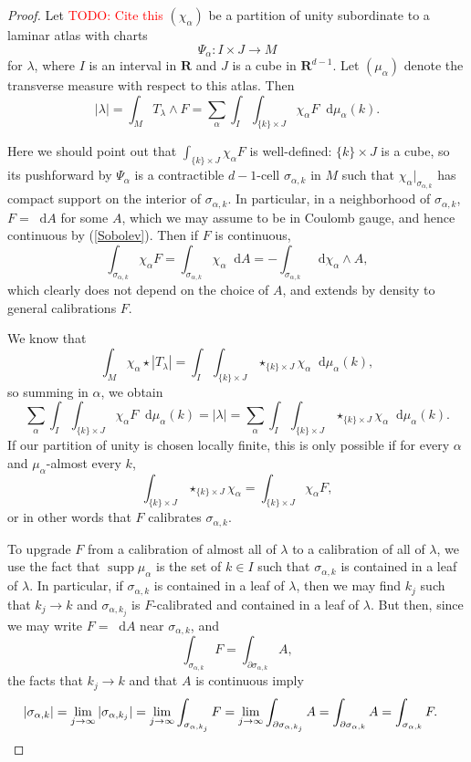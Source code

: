 \documentclass[reqno,11pt]{amsart}
\newcommand{\RR}{\mathbf{R}}
\newcommand*\dif{\mathop{}\!\mathrm{d}}
\DeclareMathOperator{\supp}{supp}
\theoremstyle{definition}
\numberwithin{equation}{section}
\newcommand\todo[1]{\textcolor{red}{TODO: #1}}
\begin{document}
\begin{proof}
Let \todo{Cite this} $(\chi_\alpha)$ be a partition of unity subordinate to a laminar atlas with charts
$$\Psi_\alpha: I \times J \to M$$
for $\lambda$, where $I$ is an interval in $\RR$ and $J$ is a cube in $\RR^{d - 1}$.
Let $(\mu_\alpha)$ denote the transverse measure with respect to this atlas.
Then 
$$|\lambda| = \int_M T_\lambda \wedge F = \sum_\alpha \int_I \int_{\{k\} \times J} \chi_\alpha F \dif \mu_\alpha(k).$$

Here we should point out that $\int_{\{k\} \times J} \chi_\alpha F$ is well-defined: $\{k\} \times J$ is a cube, so its pushforward by $\Psi_\alpha$ is a contractible $d-1$-cell $\sigma_{\alpha, k}$ in $M$ such that $\chi_\alpha|_{\sigma_{\alpha, k}}$ has compact support on the interior of $\sigma_{\alpha, k}$.
In particular, in a neighborhood of $\sigma_{\alpha, k}$, $F = \dif A$ for some $A$, which we may assume to be in Coulomb gauge, and hence continuous by (\ref{Sobolev}).
Then if $F$ is continuous,
$$\int_{\sigma_{\alpha, k}} \chi_\alpha F = \int_{\sigma_{\alpha, k}} \chi_\alpha \dif A = -\int_{\sigma_{\alpha, k}} \dif \chi_\alpha \wedge A,$$
which clearly does not depend on the choice of $A$, and extends by density to general calibrations $F$.

We know that 
$$\int_M \chi_\alpha \star |T_\lambda| = \int_I \int_{\{k\} \times J} \star_{\{k\} \times J} \chi_\alpha \dif \mu_\alpha(k),$$
so summing in $\alpha$, we obtain 
$$\sum_\alpha \int_I \int_{\{k\} \times J} \chi_\alpha F \dif \mu_\alpha(k) = |\lambda| = \sum_\alpha \int_I \int_{\{k\} \times J} \star_{\{k\} \times J} \chi_\alpha \dif \mu_\alpha(k).$$
If our partition of unity is chosen locally finite, this is only possible if for every $\alpha$ and $\mu_\alpha$-almost every $k$, 
$$\int_{\{k\} \times J} \star_{\{k\} \times J} \chi_\alpha = \int_{\{k\} \times J} \chi_\alpha F,$$
or in other words that $F$ calibrates $\sigma_{\alpha, k}$.

To upgrade $F$ from a calibration of almost all of $\lambda$ to a calibration of all of $\lambda$, we use the fact that $\supp \mu_\alpha$ is the set of $k \in I$ such that $\sigma_{\alpha, k}$ is contained in a leaf of $\lambda$.
In particular, if $\sigma_{\alpha, k}$ is contained in a leaf of $\lambda$, then we may find $k_j$ such that $k_j \to k$ and $\sigma_{\alpha, k_j}$ is $F$-calibrated and contained in a leaf of $\lambda$.
But then, since we may write $F = \dif A$ near $\sigma_{\alpha, k}$, and 
$$\int_{\sigma_{\alpha, k}} F = \int_{\partial \sigma_{\alpha, k}} A,$$
the facts that $k_j \to k$ and that $A$ is continuous imply 
\begin{align*}
|\sigma_{\alpha, k}| &= \lim_{j \to \infty} |\sigma_{\alpha, k_j}| = \lim_{j \to \infty} \int_{\sigma_{\alpha, k_j}} F = \lim_{j \to \infty} \int_{\partial \sigma_{\alpha, k_j}} A = \int_{\partial \sigma_{\alpha, k}} A = \int_{\sigma_{\alpha, k}} F. \qedhere 
\end{align*}
\end{proof}
\end{document}
